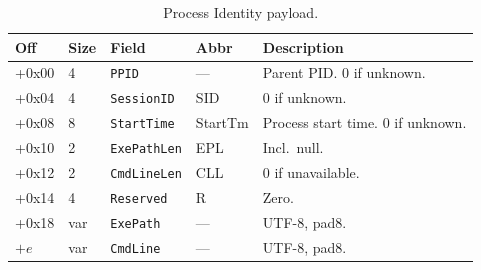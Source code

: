\documentclass[11pt,a4paper]{article}
\newcommand{\field}[1]{\texttt{#1}}
\begin{document}
\begin{table}[H]\centering\caption{Process Identity payload.}\label{tab:procident}\small
\begin{tabular}{M M l l p{4cm}}\toprule\textbf{Off}&\textbf{Size}&\textbf{Field}&\textbf{Abbr}&\textbf{Description}\\\midrule
+0x00 & 4 & \field{PPID} & --- & Parent PID. 0 if unknown. \\
+0x04 & 4 & \field{SessionID} & SID & 0 if unknown. \\
+0x08 & 8 & \field{StartTime} & StartTm & Process start time. 0 if unknown. \\
+0x10 & 2 & \field{ExePathLen} & EPL & Incl.\ null. \\
+0x12 & 2 & \field{CmdLineLen} & CLL & 0 if unavailable. \\
+0x14 & 4 & \field{Reserved} & R & Zero. \\
+0x18 & var & \field{ExePath} & --- & UTF-8, pad8. \\
$+e$ & var & \field{CmdLine} & --- & UTF-8, pad8. \\\bottomrule
\end{tabular}\end{table}
\end{document}
